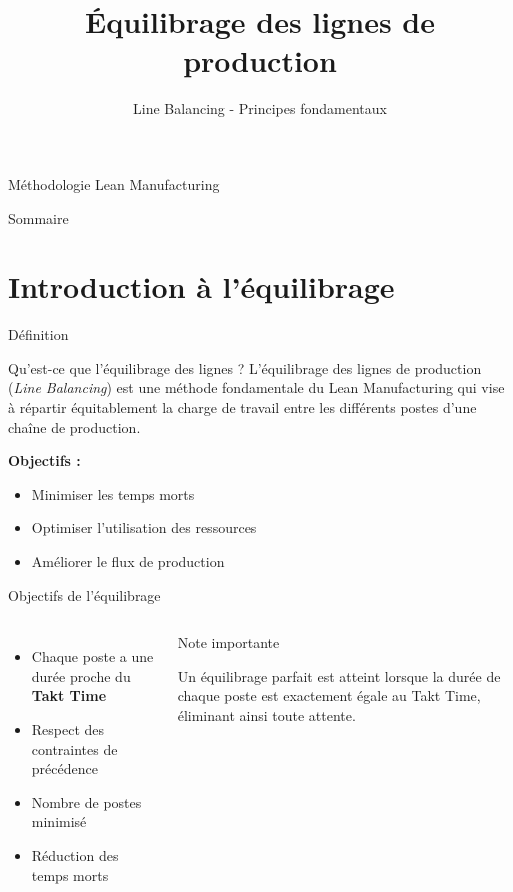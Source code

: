 \documentclass{beamer}
\title{Équilibrage des lignes de production}
\subtitle{Line Balancing - Principes fondamentaux}
\author{}
\institute{}
\date{}
\newenvironment{importantnote}
{%
    \begin{block}{Note importante}
}
{%
    \end{block}
}
\begin{document}
\begin{frame}
    \titlepage
    \begin{center}
        \small Méthodologie Lean Manufacturing
    \end{center}
\end{frame}

\begin{frame}{Sommaire}
    \tableofcontents
\end{frame}

\section{Introduction à l'équilibrage}

\begin{frame}{Définition}
    \begin{block}{Qu'est-ce que l'équilibrage des lignes ?}
        L'équilibrage des lignes de production (\textit{Line Balancing}) est une méthode fondamentale du Lean Manufacturing qui vise à répartir équitablement la charge de travail entre les différents postes d'une chaîne de production.
    \end{block}
    
    \vspace{0.5cm}
    
    \textbf{Objectifs :}
    \begin{itemize}
        \item Minimiser les temps morts
        \item Optimiser l'utilisation des ressources
        \item Améliorer le flux de production
    \end{itemize}
\end{frame}

\begin{frame}{Objectifs de l'équilibrage}
    \begin{columns}
        \begin{itemize}
            \item Chaque poste a une durée proche du \textbf{Takt Time}
            \item Respect des contraintes de précédence
            \item Nombre de postes minimisé
            \item Réduction des temps morts
        \end{itemize}
        
        \begin{importantnote}
            Un équilibrage parfait est atteint lorsque la durée de chaque poste est exactement égale au Takt Time, éliminant ainsi toute attente.
        \end{importantnote}
    \end{columns}
\end{frame}
\end{document}
